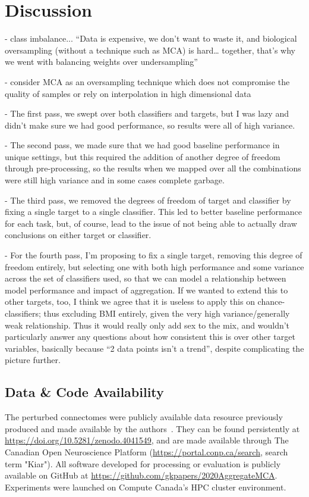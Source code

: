\documentclass[10pt]{SelfArx} %
\begin{document}
\section*{Discussion}

- class imbalance... “Data is expensive, we don’t want to waste it, and biological oversampling (without a technique such as MCA) is hard… together, that’s why we went with balancing weights over undersampling”

- consider MCA as an oversampling technique which does not compromise the quality of samples or rely on interpolation in high dimensional data

- The first pass, we swept over both classifiers and targets, but I was lazy and didn’t make sure we had good performance, so results were all of high variance.

- The second pass, we made sure that we had good baseline performance in unique settings, but this required the addition of another degree of freedom through pre-processing, so the results when we mapped over all the combinations were still high variance and in some cases complete garbage.

- The third pass, we removed the degrees of freedom of target and classifier by fixing a single target to a single classifier. This led to better baseline performance for each task, but, of course, lead to the issue of not being able to actually draw conclusions on either target or classifier.

- For the fourth pass, I’m proposing to fix a single target, removing this degree of freedom entirely, but selecting one with both high performance and some variance across the set of classifiers used, so that we can model a relationship between model performance and impact of aggregation. If we wanted to extend this to other targets, too, I think we agree that it is useless to apply this on chance-classifiers; thus excluding BMI entirely, given the very high variance/generally weak relationship. Thus it would really only add sex to the mix, and wouldn’t particularly answer any questions about how consistent this is over other target variables, basically because “2 data points isn’t a trend”, despite complicating the picture further.

\subsection*{Data \& Code Availability}
The perturbed connectomes were publicly available data resource previously produced and made available by the
authors~\cite{Kiar2020-yz}. They can be found persistently at \url{https://doi.org/10.5281/zenodo.4041549}, and are
made available through The Canadian Open Neuroscience Platform (\url{https://portal.conp.ca/search}, search term
"Kiar"). All software developed for processing or evaluation is publicly available on GitHub at
\url{https://github.com/gkpapers/2020AggregateMCA}. Experiments were launched on Compute Canada's HPC cluster
environment. 
\end{document}
